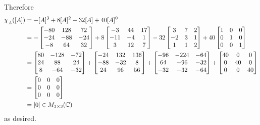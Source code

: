 \documentclass[12pt, letterpaper]{article}
\newcommand{\C}{\mathbb{C}}
\begin{document}
Therefore
\begin{align*}
	\chi_{\raisebox{-.5ex}{$\scriptstyle A$}}([A]) 
	&=
	-[A]^3+8[A]^2-32[A]+40[A]^0 \\
	&=
	-
	\begin{bmatrix}
	-80 & 128 & 72 \\
	-24 & -88 & -24 \\
	-8 & 64 & 32 \\
	\end{bmatrix}
	+8
	\begin{bmatrix}
	-3 & 44 & 17 \\
	-11 & -4 & 1 \\
	3 & 12 & 7 \\
	\end{bmatrix} 
	-32
	\begin{bmatrix}
	3 & 7 & 2 \\
	-2 & 3 & 1 \\
	1 & 1 & 2 \\
	\end{bmatrix}
	+40
	\begin{bmatrix}
	1 & 0 & 0 \\
	0 & 1 & 0 \\
	0 & 0 & 1 \\
	\end{bmatrix} \\
	&=
	\begin{bmatrix}
	80 & -128 & -72 \\
	24 & 88 & 24 \\
	8 & -64 & -32 \\
	\end{bmatrix}
	+
	\begin{bmatrix}
	-24 & 132 & 136 \\
	-88 & -32 & 8 \\
	24 & 96 & 56 \\
	\end{bmatrix} 
	+
	\begin{bmatrix}
	-96 & -224 & -64 \\
	64 & -96 & -32 \\
	-32 & -32 & -64 \\
	\end{bmatrix}
	+
	\begin{bmatrix}
	40 & 0 & 0 \\
	0 & 40 & 0 \\
	0 & 0 & 40 \\
	\end{bmatrix} \\
	&=
	\begin{bmatrix}
	0 & 0 & 0 \\
	0 & 0 & 0 \\
	0 & 0 & 0 \\
	\end{bmatrix} \\
	&=
	[0] \in M_{3\times3}(\C)		 
\end{align*}
as desired.	
\end{document}
